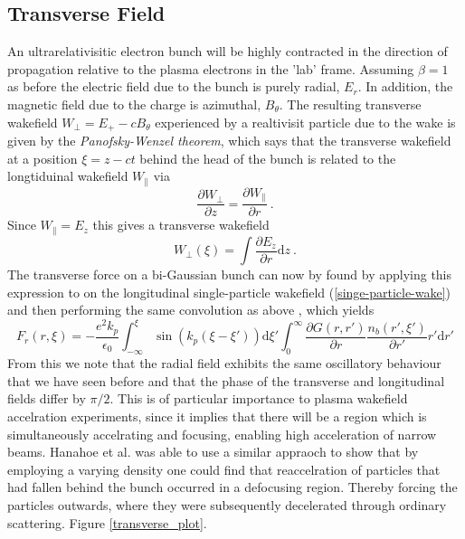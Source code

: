 \subsection{Transverse Field} 
An ultrarelativisitic electron bunch will be highly contracted in the direction of propagation relative to the plasma electrons in the 'lab' frame. Assuming $\beta=1$ as before the electric field due to the bunch is purely radial, $E_r$. In addition, the magnetic field due to the charge is azimuthal, $B_{\theta}$. The resulting transverse wakefield $W_{\perp}=E_+-cB_{\theta}$ experienced by a realtivisit particle due to the wake is given by the \textit{Panofsky-Wenzel theorem}\cite{Vaganian1995}, which says that the transverse wakefield at a position $\xi=z-ct$ behind the head of the bunch is related to the longtiduinal wakefield $W_{\parallel}$ via
\begin{equation}
\frac{\partial W_{\perp} }{\partial z}=\frac{\partial W_{\parallel} }{\partial r}~.
\end{equation} 
Since $W_{\parallel} =E_z$ this gives a transverse wakefield
\begin{equation}
W_{\perp}(\xi)=\int \frac{\partial E_z }{\partial r}\mathrm{d}z~.
\end{equation}
The transverse force on a bi-Gaussian bunch can now by found by applying this expression to on the longitudinal single-particle wakefield (\ref{singe-particle-wake}) and then performing the same convolution as above \cite{Katsouleas1987, Mira2017}, which yields 
\begin{equation}
F_r(r,\xi)=-\frac{e^2 k_p}{\epsilon_0} \int_{-\infty}^{\xi} \sin(k_p(\xi-\xi'))\mathrm{d}\xi' \int_{0}^{\infty}\frac{\partial G\left(r,r'\right)}{\partial r} \frac{n_b(r',\xi')}{\partial r'}
r'\mathrm{d}r'
\end{equation}
From this we note that the radial field exhibits the same oscillatory behaviour that we have seen before and that the phase of the transverse and longitudinal fields differ by $\pi/2$. This is of particular importance to plasma wakefield accelration experiments, since it implies that there will be a region which is simultaneously accelrating and focusing, enabling high acceleration of narrow beams. Hanahoe et al. was able to use a similar appraoch to show that by employing a varying density one could find that reaccelration of particles that had fallen behind the bunch occurred in a defocusing region. Thereby forcing the particles outwards, where they were subsequently decelerated through ordinary scattering. Figure \ref{transverse_plot}.\\
